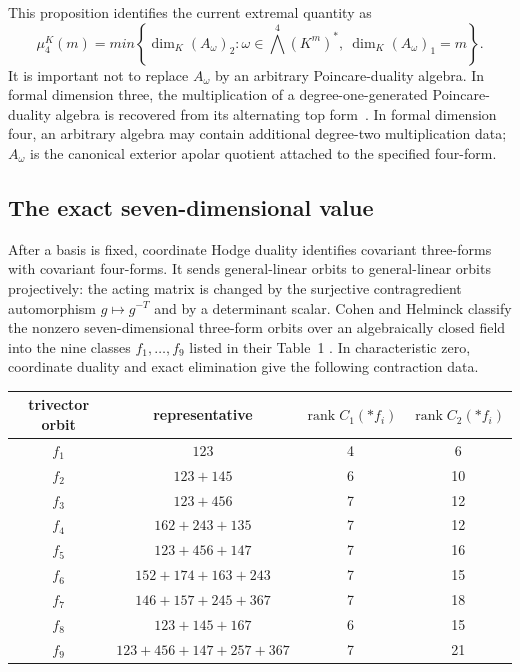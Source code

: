 This proposition identifies the current extremal quantity as
\[
  \mu_4^K(m)=min\left\{
    \dim_K(A_\omega)_2:
    \omega\in\bigwedge^4(K^m)^*,\ 
    \dim_K(A_\omega)_1=m
  \right\}.
\]
It is important not to replace $A_\omega$ by an arbitrary
Poincare-duality algebra.  In formal dimension three, the multiplication
of a degree-one-generated Poincare-duality algebra is recovered from its
alternating top form~\cite{Suciu2020PoincareDuality}.  In formal dimension
four, an arbitrary algebra may
contain additional degree-two multiplication data; $A_\omega$ is the
canonical exterior apolar quotient attached to the specified four-form.

\subsection{The exact seven-dimensional value}

After a basis is fixed, coordinate Hodge duality identifies covariant
three-forms with covariant four-forms.  It sends general-linear orbits to
general-linear orbits projectively: the acting matrix is changed by the
surjective contragredient automorphism $g\mapsto g^{-T}$ and by a determinant
scalar.  Cohen and Helminck classify the nonzero seven-dimensional
three-form orbits over an algebraically closed field into the nine classes
$f_1,\ldots,f_9$ listed in their Table~1
\cite{CohenHelminck1988TrilinearForms}.  In characteristic zero, coordinate
duality and exact elimination give the following contraction data.

\begin{center}
\begin{tabular}{c|c|c|c}
trivector orbit & representative & $\operatorname{rank}C_1(*f_i)$
& $\operatorname{rank}C_2(*f_i)$ \\
\hline
$f_1$ & $123$ & 4 & 6 \\
$f_2$ & $123+145$ & 6 & 10 \\
$f_3$ & $123+456$ & 7 & 12 \\
$f_4$ & $162+243+135$ & 7 & 12 \\
$f_5$ & $123+456+147$ & 7 & 16 \\
$f_6$ & $152+174+163+243$ & 7 & 15 \\
$f_7$ & $146+157+245+367$ & 7 & 18 \\
$f_8$ & $123+145+167$ & 6 & 15 \\
$f_9$ & $123+456+147+257+367$ & 7 & 21
\end{tabular}
\end{center}

